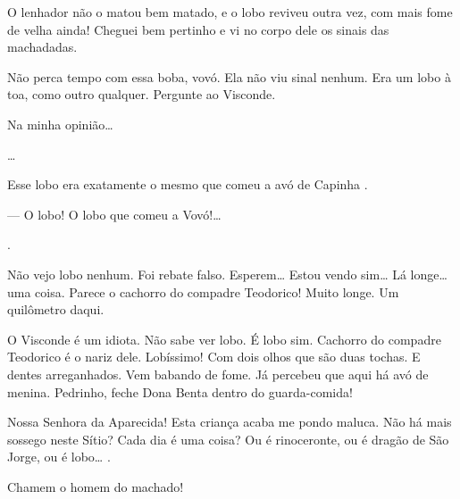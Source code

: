  O lenhador não o matou bem matado, e o lobo reviveu outra
vez, com mais fome de velha ainda! Cheguei bem pertinho e vi no corpo
dele os sinais das machadadas.

 Não perca tempo com essa boba, vovó. Ela não viu sinal
nenhum. Era um lobo à toa, como outro qualquer. Pergunte ao Visconde.

 Na minha opinião\ldots{}

\ldots{}

 Esse lobo era exatamente o mesmo que comeu a avó de Capinha
.


  --- O lobo! O
lobo que comeu a Vovó!\ldots{}

.

 Não vejo lobo nenhum. Foi rebate falso. Esperem\ldots{}
Estou vendo sim\ldots{} Lá longe\ldots{} uma coisa. Parece o cachorro do
compadre Teodorico! Muito longe. Um quilômetro daqui.

 O Visconde é um idiota. Não sabe ver lobo.  É lobo sim. Cachorro do compadre
Teodorico é o nariz dele. Lobíssimo! Com dois olhos que são duas tochas.
E dentes arreganhados. Vem babando de fome. Já percebeu que aqui há avó
de menina. Pedrinho, feche Dona Benta dentro do guarda-comida!

 Nossa Senhora da Aparecida! Esta criança acaba me pondo
maluca. Não há mais sossego neste Sítio? Cada dia é uma coisa? Ou é
rinoceronte, ou é dragão de São Jorge, ou é lobo\ldots{} .

 Chamem o homem do machado!


